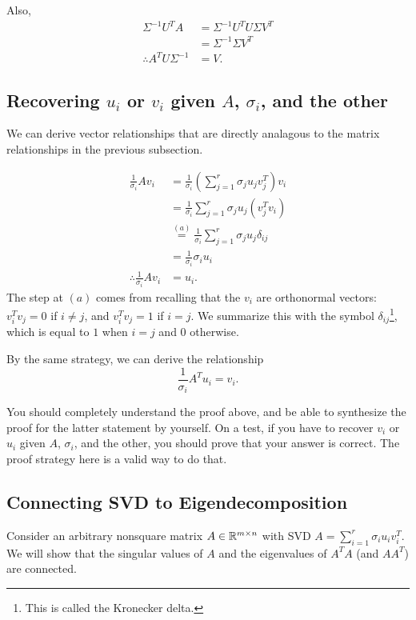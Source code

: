 \documentclass[12pt]{article}
\begin{document}
Also, 
%
\begin{align*}
\Sigma^{-1}U^T A &= \Sigma^{-1} U^T U \Sigma V^T  \\
&= \Sigma^{-1}\Sigma V^T \\
\therefore A^T U \Sigma^{-1} &= V.
\end{align*}


\subsection{Recovering $u_i$ or $v_i$ given $A$, $\sigma_i$, and the other}

We can derive vector relationships that are directly analagous to the matrix relationships in the previous subsection. 

\begin{align*}
\frac{1}{\sigma_i} Av_i &= \frac{1}{\sigma_i} \left( \sum_{j=1}^r \sigma_j u_j v_j^T \right) v_i \\
&= \frac{1}{\sigma_i} \sum_{j=1}^r \sigma_j u_j \left( v_j^T v_i \right) \\
&\overset{(a)}{=}  \frac{1}{\sigma_i} \sum_{j=1}^r \sigma_j u_j \delta_{ij} \\
&= \frac{1}{\sigma_i} \sigma_i u_i \\
\therefore \frac{1}{\sigma_i} Av_i  &= u_i. 
\end{align*}
%
The step at $(a)$ comes from recalling that the $v_i$ are orthonormal vectors: $v_i^T v_j = 0$ if $i \neq j$, and $v_i^T v_j = 1$ if $i = j$. We summarize this with the symbol $\delta_{ij}$\footnote{This is called the Kronecker delta.}, which is equal to $1$ when $i=j$ and $0$ otherwise. 

By the same strategy, we can derive the relationship
%
\begin{equation*}
\frac{1}{\sigma_i} A^T u_i = v_i.
\end{equation*}

You should completely understand the proof above, and be able to synthesize the proof for the latter statement by yourself. On a test, if you have to recover $v_i$ or $u_i$ given $A$, $\sigma_i$, and the other, you should prove that your answer is correct. The proof strategy here is a valid way to do that.

\subsection{Connecting SVD to Eigendecomposition}

Consider an arbitrary nonsquare matrix $A \in { {\mathbb R}^{m \times n} }$ with SVD $A = \sum_{i=1}^r \sigma_i u_i v_i^T$. We will show that the singular values of $A$ and the eigenvalues of $A^T A$ (and $AA^T$) are connected.
\end{document}

